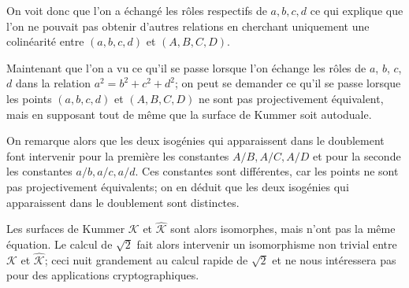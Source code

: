\documentclass[a4paper,12pt]{article}
\theoremstyle{definition}
\theoremstyle{remark}
\numberwithin{equation}{section}
\begin{document}
On voit donc que l'on a échangé les rôles respectifs de $a,b,c,d$ ce qui explique que l'on ne pouvait pas obtenir d'autres relations en cherchant uniquement une colinéarité entre $(a,b,c,d)$ et $(A,B,C,D)$.

Maintenant que l'on a vu ce qu'il se passe lorsque l'on échange les rôles de $a$, $b$, $c$, $d$ dans la relation $a^2 = b^2 + c^2 + d^2$; on peut se demander ce qu'il se passe lorsque les points $(a,b,c,d)$ et $(A,B,C,D)$ ne sont pas projectivement équivalent, mais en supposant tout de même que la surface de Kummer soit autoduale.

On remarque alors que les deux isogénies qui apparaissent dans le doublement font intervenir pour la première les constantes $A/B,A/C,A/D$ et pour la seconde les constantes $a/b,a/c,a/d$. Ces constantes sont différentes, car les points ne sont pas projectivement équivalents; on en déduit que les deux isogénies qui apparaissent dans le doublement sont distinctes.

Les surfaces de Kummer $\mathcal{K}$ et $\hat{\mathcal{K}}$ sont alors isomorphes, mais n'ont pas la même équation. Le calcul de $\sqrt{2}$ fait alors intervenir un isomorphisme non trivial entre $\mathcal{K}$ et $\hat{\mathcal{K}}$; ceci nuit grandement au calcul rapide de $\sqrt{2}$ et ne nous intéressera pas pour des applications cryptographiques.


%
\end{document}
